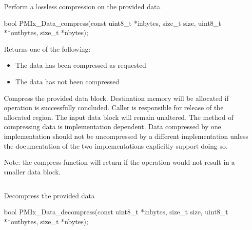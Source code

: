 Perform a lossless compression on the provided data

\format

\cspecificstart
\begin{codepar}
bool
PMIx_Data_compress(const uint8_t *inbytes, size_t size,
                   uint8_t **outbytes, size_t *nbytes);
\end{codepar}
\cspecificend

\begin{arglist}
\end{arglist}

Returns one of the following:
\begin{itemize}
\item {} The data has been compressed as requested
\item {} The data has not been compressed
\end{itemize}

\descr

Compress the provided data block. Destination memory
will be allocated if operation is successfully concluded. Caller
is responsible for release of the allocated region. The input
data block will remain unaltered.  
The method of compressing data is implementation dependent. 
Data compressed by one implementation should not be uncompressed by a different implementation unless 
the documentation of the two implementations explicitly support doing so.

Note: the compress function will return  if the operation
would not result in a smaller data block.



\subsection{}

\summary

Decompress the provided data

\format

\cspecificstart
\begin{codepar}
bool
PMIx_Data_decompress(const uint8_t *inbytes, size_t size,
                     uint8_t **outbytes, size_t *nbytes);
\end{codepar}
\cspecificend


